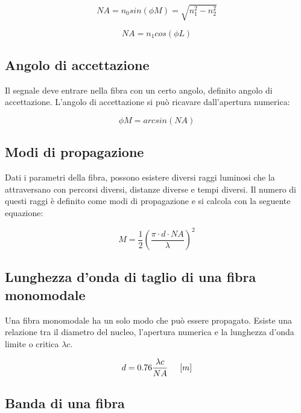 \documentclass{article}
\begin{document}
    \begin{equation}
        NA = n_0 sin(\phi M) = \sqrt{n_1^2 - n_2^2}
    \end{equation}

    \begin{equation}
        NA = n_1 cos(\phi L)
    \end{equation}

    \subsection{Angolo di accettazione}

    Il segnale deve entrare nella fibra con un certo angolo, definito angolo di accettazione. L'angolo di accettazione si
    può ricavare dall'apertura numerica:

    \begin{equation}
        \phi M = arcsin(NA)
    \end{equation}

    \subsection{Modi di propagazione}

    Dati i parametri della fibra, possono esistere diversi raggi luminosi che la attraversano con percorsi diversi, distanze diverse
    e tempi diversi. Il numero di questi raggi è definito come modi di propagazione e si calcola con la seguente equazione:

    \begin{equation}
        M = \frac{1}{2} (\frac{\pi \cdot d \cdot NA}{\lambda})^2
    \end{equation}

    \subsection{Lunghezza d'onda di taglio di una fibra monomodale}

    Una fibra monomodale ha un solo modo che può essere propagato. Esiste una relazione tra il diametro del nucleo, l'apertura
    numerica e la lunghezza d'onda limite o critica $\lambda c$.

    \begin{equation}
        d = 0.76 \frac{\lambda c}{NA} \hspace{0.5cm} [m]
    \end{equation}

    \subsection{Banda di una fibra}
\end{document}
